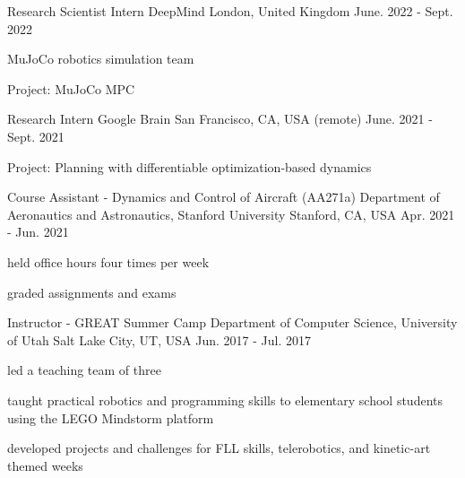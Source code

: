 

\begin{cventries}
	
\cventry
{Research Scientist Intern} %
{DeepMind} %
{London, United Kingdom} %
{June. 2022 - Sept. 2022} %
{
	\begin{cvitems} %
		\item{MuJoCo robotics simulation team}
		\item{Project: MuJoCo MPC}
	\end{cvitems}
}

\cventry
{Research Intern} %
{Google Brain} %
{San Francisco, CA, USA (remote)} %
{June. 2021 - Sept. 2021} %
{
	\begin{cvitems} %
		\item{Project: Planning with differentiable optimization-based dynamics}
	\end{cvitems}
}
	
\cventry
{Course Assistant - Dynamics and Control of Aircraft (AA271a)} %
{Department of Aeronautics and Astronautics, Stanford University} %
{Stanford, CA, USA} %
{Apr. 2021 - Jun. 2021} %
{
	\begin{cvitems} %
		\item{held office hours four times per week}
		\item{graded assignments and exams}
	\end{cvitems}
}

  \cventry
    {Instructor - GREAT Summer Camp} %
    {Department of Computer Science, University of Utah} %
    {Salt Lake City, UT, USA} %
    {Jun. 2017 - Jul. 2017} %
    {
      \begin{cvitems} %
        \item {led a teaching team of three}
        \item{taught practical robotics and programming skills to elementary school students using the LEGO Mindstorm platform}
        \item {developed projects and challenges for FLL skills, telerobotics, and kinetic-art themed weeks}
      \end{cvitems}
    }


\end{cventries}

